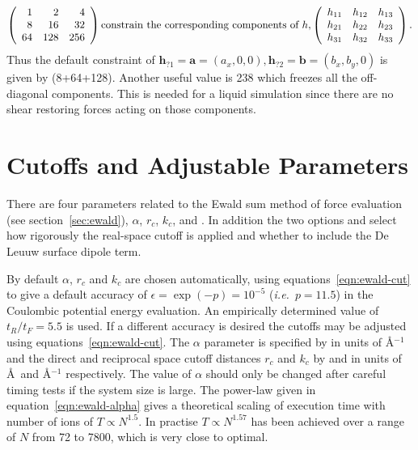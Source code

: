 \documentclass[a4paper,twoside]{report}
\newcommand{\bm}[1]{\mathbf{#1}}
\newcommand{\ie}{\emph{i.e.}}
\begin{document}
\begin{displaymath}
\left (
\begin{array}{rrr}
1 & 2 & 4 \\ 8 & 16 & 32 \\ 64 & 128 & 256
\end{array}
\right )
\textnormal{constrain the corresponding components of }
h, 
\left (
\begin{array}{rrr}
h_{11} & h_{12} & h_{13} \\ h_{21} & h_{22} & h_{23} \\ h_{31} & h_{32} & h_{33}
\end{array}
\right ).
\end{displaymath}
\noindent
Thus the default constraint of $\bm{h}_{?1} = \bm{a} = (a_x,0,0),
\bm{h}_{?2} = \bm{b} = (b_x,b_y,0)$ is given by 
\linebreak[2]
(8+64+128).  Another useful value is 238 which freezes all the
off-diagonal components.  This is needed for a liquid simulation since
there are no shear restoring forces acting on those components.

\section{Cutoffs and Adjustable Parameters}%

There are four parameters related to the Ewald sum method of force
evaluation (see section~\ref{sec:ewald}), $\alpha$, $r_c$, $k_c$, and
.  In addition the two options 
and  select how rigorously the real-space
cutoff is applied and whether to include the De Leuuw surface dipole
term.

By default $\alpha$, $r_c$ and $k_c$ are chosen automatically, using
equations~\ref{eqn:ewald-cut} to give a default accuracy of $\epsilon
= \exp(-p) = 10^{-5}$ (\ie\ $p = 11.5$) in the Coulombic potential energy
evaluation.  An empirically determined value of $t_R/t_F = 5.5$ is
used.  If a different accuracy is desired the cutoffs may be adjusted
using equations~\ref{eqn:ewald-cut}.  The $\alpha$ parameter is
specified by  in units of \AA$^{-1}$ and the direct and
reciprocal space cutoff distances $r_{c}$ and $k_{c}$ by
 and  in units of \AA\ and \AA$^{-1}$
respectively.  The value of $\alpha$ should only be changed after
careful timing tests if the system size is large.  The power-law given
in equation~\ref{eqn:ewald-alpha} gives a theoretical scaling of
execution time with number of ions of $T \propto N^{1.5}$. In practise $T
\propto N^{1.57}$ has been achieved over a range of $N$ from 72 to
7800, which is very close to optimal.
\end{document}
